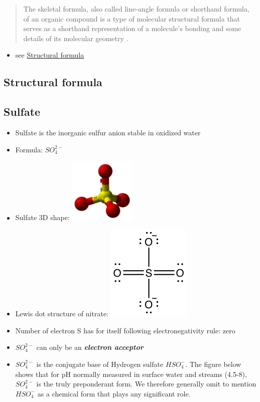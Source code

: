 \documentclass[]{book}
\providecommand{\tightlist}{%
  \setlength{\itemsep}{0pt}\setlength{\parskip}{0pt}}
\theoremstyle{definition}
\theoremstyle{definition}
\theoremstyle{definition}
\theoremstyle{remark}
\begin{document}
\begin{quote}
The skeletal formula, also called line-angle formula or shorthand
formula, of an organic compound is a type of molecular structural
formula that serves as a shorthand representation of a molecule's
bonding and some details of its molecular geometry
\citep{Wikipedia_contributors2018-sa}.
\end{quote}

\begin{itemize}
\tightlist
\item
  see \protect\hyperlink{structural-formula}{Structural formula}
\end{itemize}

\hypertarget{structural-formula}{\subsection{Structural
formula}\label{structural-formula}}

\subsection{Sulfate}\label{sulfate}

\begin{itemize}
\tightlist
\item
  Sulfate is the inorganic sulfur anion stable in oxidized water
\item
  Formula: \(SO_4^{2-}\)
\item
  Sulfate 3D shape:
  \includegraphics[width=0.25000\textwidth]{pictures/Sulfate-3D-balls.png}
\item
  Lewis dot structure of nitrate:
  \includegraphics{pictures/sulfate_lewis_structure.png}
\item
  Number of electron S has for itself following electronegativity rule:
  zero
\item
  \(SO_4^{2-}\) can only be an \emph{\textbf{electron acceptor}}
\item
  \(SO_4^{2-}\) is the conjugate base of Hydrogen sulfate \(HSO_4^{-}\).
  The figure below shows that for pH normally measured in surface water
  and streams (4.5-8), \(SO_4^{2-}\) is the truly preponderant form. We
  therefore generally omit to mention \(HSO_4^{-}\) as a chemical form
  that plays any significant role.
\end{itemize}
\end{document}
